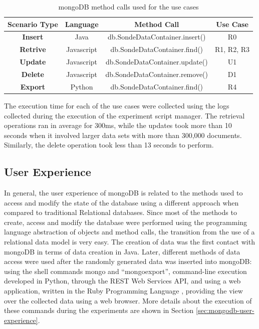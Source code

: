 \begin{table}[!h]
    \begin{center}
        \begin{tabular}{|c|c|c|c|}\hline
        \textbf{Scenario Type} & \textbf{Language} & \textbf{Method Call} & \textbf{Use Case}\\\hline 
        \textbf{Insert} & Java & db.SondeDataContainer.insert() & R0\\\hline
        \textbf{Retrive} & Javascript & db.SondeDataContainer.find() & R1, R2, R3\\\hline 
        \textbf{Update} & Javascript & db.SondeDataContainer.update() & U1\\\hline 
        \textbf{Delete} & Javascript & db.SondeDataContainer.remove() & D1\\\hline
        \textbf{Export} & Python & db.SondeDataContainer.find() & R4\\\hline
        \end{tabular}
        \caption{mongoDB method calls used for the use cases}
    \end{center}
    \label{tab:experiment-scenarios-mongo-methods}
\end{table}

The execution time for each of the use cases were collected using the logs
collected during the execution of the experiment script manager. The retrieval
operations ran in average for 300ms, while the updates took more than 10
seconds when it involved larger data sets with more than 300,000 documents.
Similarly, the delete operation took less than 13 seconds to perform.

\subsection{User Experience}
\label{sec:experiments-user-experimence}

In general, the user experience of mongoDB is related to the methods used to
access and modify the state of the database using a different approach when
compared to traditional Relational databases. Since most of the methods to
create, access and modify the database were performed using the programming
language abstraction of objects and method calls, the transition from the use
of a relational data model is very easy. The creation of data was the first
contact with mongoDB in terms of data creation in Java. Later, different
methods of data access were used after the randomly generated data was
inserted into mongoDB: using the shell commands mongo and ``mongoexport'',
command-line execution developed in Python, through the REST Web Services API,
and using a web application, written in the Ruby Programming Language
\cite{ruby}, providing the view over the collected data using a web browser.
More details about the execution of these commands during the experiments are
shown in Section \ref{sec:mongodb-user-experience}.

